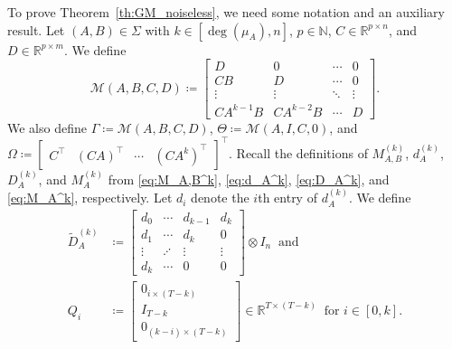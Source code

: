 \documentclass[journal,twoside,web]{ieeecolor}
\begin{document}
To prove Theorem~\ref{th:GM_noiseless}, we need some notation and an auxiliary result. Let $(A,B)\in\Sigma$ with $k\in[\deg(\mu_A),n]$, $p\in\mathbb{N}$, \mbox{$C\in\mathbb{R}^{p\times n}$}, and $D\in\mathbb{R}^{p\times m}$. We define 
\begin{equation}
\mathcal{M}(A,B,C,D)\coloneqq \begin{bmatrix}
D & 0 & \cdots & 0 \\
CB & D & \cdots & 0 \\
\vdots & \vdots & \ddots & \vdots \\
C A^{k-1} B & C A^{k-2} B & \cdots & D 
\end{bmatrix}.
\end{equation}
We also define $\Gamma\coloneqq \mathcal{M}(A,B,C,D)$, $\Theta\coloneqq\mathcal{M}(A,I,C,0)$, and $\Omega\coloneqq \begin{bmatrix}
C^\top & (CA)^\top & \cdots & (CA^{k})^\top
\end{bmatrix}^\top$. Recall the definitions of $M^{(k)}_{A,B}$, $d_A^{(k)}$, $D_A^{(k)}$, and $M^{(k)}_A$ from \eqref{eq:M_A,B^k}, \eqref{eq:d_A^k}, \eqref{eq:D_A^k}, and \eqref{eq:M_A^k}, respectively. Let $d_i$ denote the $i$th entry of $d_A^{(k)}$. We define
\begin{equation}
\begin{split}
\tilde{D}_{A}^{(k)}&\coloneqq \begin{bmatrix}
d_0 & \cdots & d_{k-1} & d_k \\
d_1 & \cdots & d_k & 0 \\
\vdots & \iddots & \vdots & \vdots \\
d_k & \cdots & 0 & 0
\end{bmatrix}\otimes I_n\ \text{ and }\\
\label{eq:def_Q}
Q_i&\coloneqq\begin{bmatrix}
0_{i\times (T-k)} \\ I_{T-k} \\ 0_{(k-i)\times(T-k)}
\end{bmatrix}\in\mathbb{R}^{T\times (T-k)}\ \text{ for } i\in[0,k].
\end{split}
\end{equation}
\end{document}
